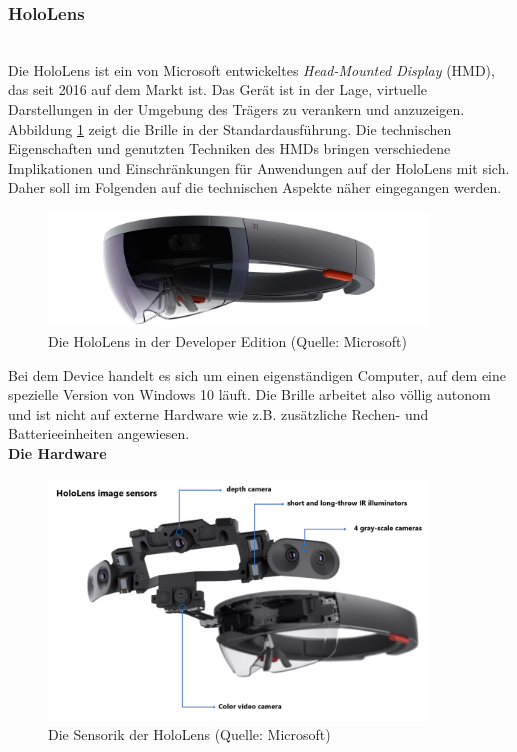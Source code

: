 \subsubsection{HoloLens}
\label{sec-2-1-2}
\\

Die HoloLens ist ein von Microsoft entwickeltes \textit{Head-Mounted Display} (HMD), das seit 2016 auf dem Markt ist. Das Gerät ist in der Lage, virtuelle Darstellungen in der Umgebung des Trägers zu verankern und anzuzeigen. Abbildung \ref{img:hololens} zeigt die Brille in der Standardausführung. Die technischen Eigenschaften und genutzten Techniken des HMDs bringen verschiedene Implikationen und Einschränkungen für Anwendungen auf der HoloLens mit sich. Daher soll im Folgenden auf die technischen Aspekte näher eingegangen werden.\\

\begin{figure}[h!]
	\centering
	\includegraphics[width=0.9\textwidth]{images/hololens.jpg}
	\caption{Die HoloLens in der Developer Edition (Quelle: Microsoft)}
	\label{img:hololens}
\end{figure}

Bei dem Device handelt es sich um einen eigenständigen Computer, auf dem eine spezielle Version von Windows 10 läuft. Die Brille arbeitet also völlig autonom und ist nicht auf externe Hardware wie z.B. zusätzliche Rechen- und Batterieeinheiten angewiesen.\\

\textbf{Die Hardware}\\
\begin{figure}[h!]
	\centering
	\includegraphics[width=0.9\textwidth]{images/hololens_tech.png}
	\caption{Die Sensorik der HoloLens (Quelle: Microsoft)}
	\label{img:hololens_tech}
\end{figure}

